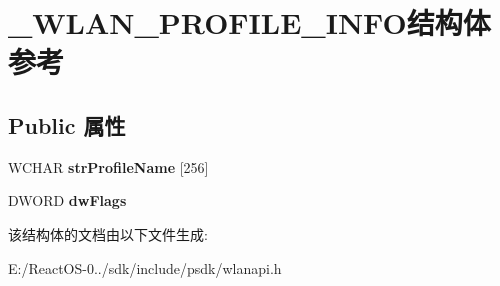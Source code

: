 \hypertarget{struct___w_l_a_n___p_r_o_f_i_l_e___i_n_f_o}{}\section{\+\_\+\+W\+L\+A\+N\+\_\+\+P\+R\+O\+F\+I\+L\+E\+\_\+\+I\+N\+F\+O结构体 参考}
\label{struct___w_l_a_n___p_r_o_f_i_l_e___i_n_f_o}
\subsection*{Public 属性}
\begin{DoxyCompactItemize}
\item 
\mbox{\label{struct___w_l_a_n___p_r_o_f_i_l_e___i_n_f_o_a77c3e1b551d9ce7d90757e714dc1851e}} 
W\+C\+H\+AR {\bfseries str\+Profile\+Name} \mbox{[}256\mbox{]}
\item 
\mbox{\label{struct___w_l_a_n___p_r_o_f_i_l_e___i_n_f_o_a93df8346b1c8233efb649bb7ad1f974a}} 
D\+W\+O\+RD {\bfseries dw\+Flags}
\end{DoxyCompactItemize}


该结构体的文档由以下文件生成\+:\begin{DoxyCompactItemize}
\item 
E\+:/\+React\+O\+S-\/0../sdk/include/psdk/wlanapi.\+h\end{DoxyCompactItemize}
